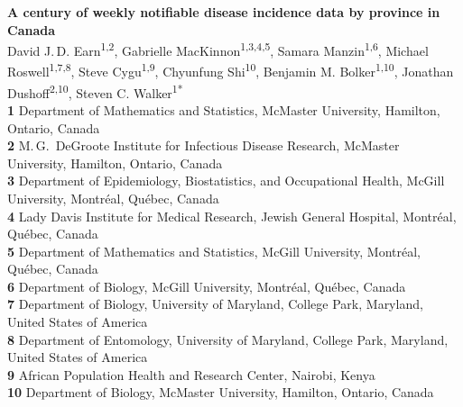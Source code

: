 \documentclass[10pt,letterpaper]{article}
\begin{document}
\vspace*{0.2in}

\begin{flushleft}
{\Large
\textbf{A century of weekly notifiable disease incidence data by province in Canada} %
}
\newline
\\
David J.\,D. Earn\textsuperscript{1,2},
Gabrielle MacKinnon\textsuperscript{1,3,4,5},
Samara Manzin\textsuperscript{1,6},
Michael Roswell\textsuperscript{1,7,8},
Steve Cygu\textsuperscript{1,9},
Chyunfung Shi\textsuperscript{10},
Benjamin M. Bolker\textsuperscript{1,10},
Jonathan Dushoff\textsuperscript{2,10},
Steven C. Walker\textsuperscript{1*}
\\
\bigskip
\textbf{1} Department of Mathematics and Statistics, McMaster University, Hamilton, Ontario, Canada
\\
\textbf{2} M.\,G.\ DeGroote Institute for Infectious Disease Research, McMaster University, Hamilton, Ontario, Canada
\\
\textbf{3} Department of Epidemiology, Biostatistics, and Occupational Health, McGill University, Montr\'{e}al, Qu\'{e}bec, Canada
\\
\textbf{4} Lady Davis Institute for Medical Research, Jewish General Hospital, Montr\'{e}al, Qu\'{e}bec, Canada
\\
\textbf{5} Department of Mathematics and Statistics, McGill University, Montr\'{e}al, Qu\'{e}bec, Canada
\\
\textbf{6} Department of Biology, McGill University, Montr\'{e}al, Qu\'{e}bec, Canada
\\
\textbf{7} Department of Biology, University of Maryland, College Park, Maryland, United States of America
\\
\textbf{8} Department of Entomology, University of Maryland, College Park, Maryland, United States of America
\\
\textbf{9} African Population Health and Research Center, Nairobi, Kenya
\\
\textbf{10} Department of Biology, McMaster University, Hamilton, Ontario, Canada
\\
\bigskip

% 
%


\end{flushleft}
\end{document}
